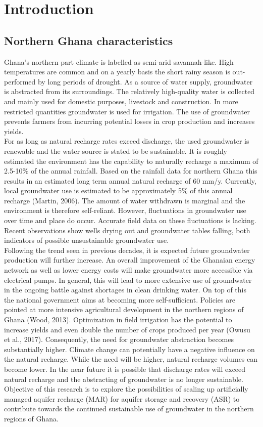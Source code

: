 \chapter{Introduction}
\section{Northern Ghana characteristics}
Ghana’s northern part climate is labelled as semi-arid savannah-like. High temperatures are common and on a yearly basis the short rainy season is out-performed by long periods of drought. As a source of water supply, groundwater is abstracted from its surroundings. The relatively high-quality water is collected and mainly used for domestic purposes, livestock and construction. In more restricted quantities groundwater is used for irrigation. The use of groundwater prevents farmers from incurring potential losses in crop production and increases yields. \bigskip\\
For as long as natural recharge rates exceed discharge, the used groundwater is renewable and the water source is stated to be sustainable. It is roughly estimated the environment has the capability to naturally recharge a maximum of 2.5-10\% of the annual rainfall. Based on the rainfall data for northern Ghana this results in an estimated long term annual natural recharge of 60 mm/y. Currently, local groundwater use is estimated to be approximately 5\% of this annual recharge (Martin, 2006). The amount of water withdrawn is marginal and the environment is therefore self-reliant. However, fluctuations in groundwater use over time and place do occur. Accurate field data on these fluctuations is lacking. Recent observations show wells drying out and groundwater tables falling, both indicators of possible unsustainable groundwater use.
\bigskip\\
Following the trend seen in previous decades, it is expected future groundwater production will further increase. An overall improvement of the Ghanaian energy network as well as lower energy costs will make groundwater more accessible via electrical pumps. In general, this will lead to more extensive use of groundwater in the ongoing battle against shortages in clean drinking water. On top of this the national government aims at becoming more self-sufficient. Policies are pointed at more intensive agricultural development in the northern regions of Ghana (Wood, 2013). Optimization in field irrigation has the potential to increase yields and even double the number of crops produced per year (Owusu et al., 2017). Consequently, the need for groundwater abstraction becomes substantially higher. Climate change can potentially have a negative influence on the natural recharge. While the need will be higher, natural recharge volumes can become lower. In the near future it is possible that discharge rates will exceed natural recharge and the abstracting of groundwater is no longer sustainable. Objective of this research is to explore the possibilities of scaling up artificially managed aquifer recharge (MAR) for aquifer storage and recovery (ASR) to contribute towards the continued sustainable use of groundwater in the northern regions of Ghana. 

